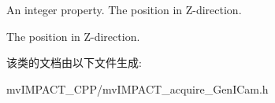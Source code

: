 An integer property. The position in Z-\/direction. 

The position in Z-\/direction. 

该类的文档由以下文件生成\+:\begin{DoxyCompactItemize}
\item 
mv\+I\+M\+P\+A\+C\+T\+\_\+\+C\+P\+P/mv\+I\+M\+P\+A\+C\+T\+\_\+acquire\+\_\+\+Gen\+I\+Cam.\+h\end{DoxyCompactItemize}
